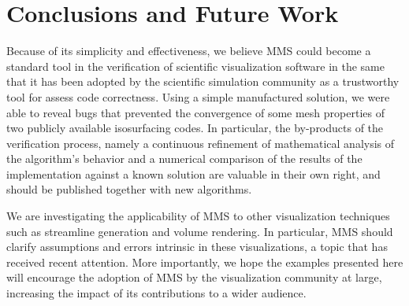 \section{Conclusions and Future Work}

Because of its simplicity and effectiveness, we believe MMS could become a
standard tool in the verification of scientific visualization software 
in the same that it has been adopted by the scientific simulation community 
as a trustworthy tool for assess code correctness.
Using a simple manufactured solution, 
we were able to reveal bugs that prevented the convergence of 
some mesh properties of two publicly available isosurfacing codes.
In particular, the by-products of the verification process, namely
a continuous refinement of mathematical analysis of the algorithm's
behavior and a numerical comparison of the results of the 
implementation against a known solution are valuable in their own right, 
and should be published together with new algorithms.

We are investigating the applicability of MMS to other
visualization techniques such as streamline generation and volume
rendering. In particular, MMS should clarify assumptions and
errors intrinsic in these visualizations, a topic that has
received recent attention\cite{Johnson:2003:NSV:942583.942610}.  More importantly, we hope the 
examples presented here will encourage the adoption of MMS by the
visualization community at large, 
increasing the impact of its contributions 
to a wider audience.

